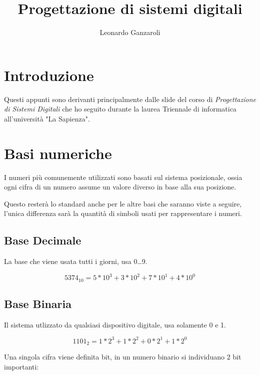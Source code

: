 \documentclass{article}
\title{Progettazione di sistemi digitali}
\author{Leonardo Ganzaroli}
\date{}
\begin{document}
\maketitle


\tableofcontents

\hypersetup{allcolors=black}

\newpage

\section*{Introduzione}

Questi appunti sono derivanti principalmente dalle slide del corso di \textit{Progettazione di Sistemi Digitali} che ho seguito durante la laurea Triennale di informatica all'università "La Sapienza".

\newpage

\section{Basi numeriche}

I numeri più comunemente utilizzati sono basati sul sistema posizionale, ossia ogni cifra di un numero assume un valore diverso in base alla sua posizione. \newline

\noindent Questo resterà lo standard anche per le altre basi che saranno viste a seguire, l'unica differenza sarà la quantità di simboli usati per rappresentare i numeri.

\subsection{Base Decimale}

La base che viene usata tutti i giorni, usa 0\ldots9.

$$5374_{10} = 5*10^3 + 3*10^2 + 7*10^1 + 4*10^0$$

\subsection{Base Binaria}

Il sistema utlizzato da qualsiasi dispositivo digitale, usa solamente 0 e 1.

$$1101_2 = 1*2^3 + 1*2^2 + 0*2^1 + 1*2^0$$\newline

\noindent Una singola cifra viene definita bit, in un numero binario si individuano 2 bit importanti:
\end{document}
